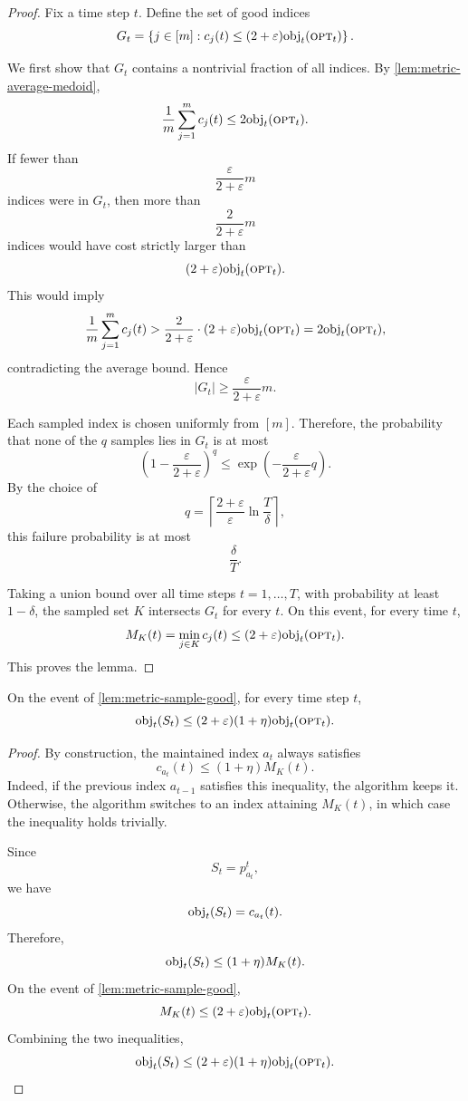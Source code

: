 \begin{proof}
Fix a time step \(t\). Define the set of good indices
\[
    G_t
    =
    \left\{
        j\in[m]:
        c_j(t)
        \le
        (2+\varepsilon)\text{obj}_t(\textsc{opt}_t)
    \right\}.
\]

We first show that \(G_t\) contains a nontrivial fraction of all indices. By
\cref{lem:metric-average-medoid},
\[
    \frac1m\sum_{j=1}^m c_j(t)
    \le
    2\text{obj}_t(\textsc{opt}_t).
\]
If fewer than
\[
    \frac{\varepsilon}{2+\varepsilon}m
\]
indices were in \(G_t\), then more than
\[
    \frac{2}{2+\varepsilon}m
\]
indices would have cost strictly larger than
\[
    (2+\varepsilon)\text{obj}_t(\textsc{opt}_t).
\]
This would imply
\[
    \frac1m\sum_{j=1}^m c_j(t)
    >
    \frac{2}{2+\varepsilon}
    \cdot
    (2+\varepsilon)\text{obj}_t(\textsc{opt}_t)
    =
    2\text{obj}_t(\textsc{opt}_t),
\]
contradicting the average bound. Hence
\[
    |G_t|
    \ge
    \frac{\varepsilon}{2+\varepsilon}m.
\]

Each sampled index is chosen uniformly from \([m]\). Therefore, the probability that none of the \(q\) samples lies in \(G_t\) is at most
\[
    \left(
        1-\frac{\varepsilon}{2+\varepsilon}
    \right)^q
    \le
    \exp\left(
        -\frac{\varepsilon}{2+\varepsilon}q
    \right).
\]
By the choice of
\[
    q
    =
    \left\lceil
        \frac{2+\varepsilon}{\varepsilon}
        \ln\frac{T}{\delta}
    \right\rceil,
\]
this failure probability is at most
\[
    \frac{\delta}{T}.
\]

Taking a union bound over all time steps \(t=1,\ldots,T\), with probability at least \(1-\delta\), the sampled set \(K\) intersects \(G_t\) for every \(t\). On this event, for every time \(t\),
\[
    M_K(t)
    =
    \min_{j\in K} c_j(t)
    \le
    (2+\varepsilon)\text{obj}_t(\textsc{opt}_t).
\]
This proves the lemma.
\end{proof}

\begin{lemma}
\label{lem:metric-sampled-competitive}
On the event of \cref{lem:metric-sample-good}, for every time step \(t\),
\[
    \text{obj}_t(S_t)
    \le
    (2+\varepsilon)(1+\eta)\text{obj}_t(\textsc{opt}_t).
\]
\end{lemma}

\begin{proof}
By construction, the maintained index \(a_t\) always satisfies
\[
    c_{a_t}(t)
    \le
    (1+\eta)M_K(t).
\]
Indeed, if the previous index \(a_{t-1}\) satisfies this inequality, the algorithm keeps it. Otherwise, the algorithm switches to an index attaining \(M_K(t)\), in which case the inequality holds trivially.

Since
\[
    S_t=p_{a_t}^t,
\]
we have
\[
    \text{obj}_t(S_t)=c_{a_t}(t).
\]
Therefore,
\[
    \text{obj}_t(S_t)
    \le
    (1+\eta)M_K(t).
\]
On the event of \cref{lem:metric-sample-good},
\[
    M_K(t)
    \le
    (2+\varepsilon)\text{obj}_t(\textsc{opt}_t).
\]
Combining the two inequalities,
\[
    \text{obj}_t(S_t)
    \le
    (2+\varepsilon)(1+\eta)\text{obj}_t(\textsc{opt}_t).
\]
\end{proof}

